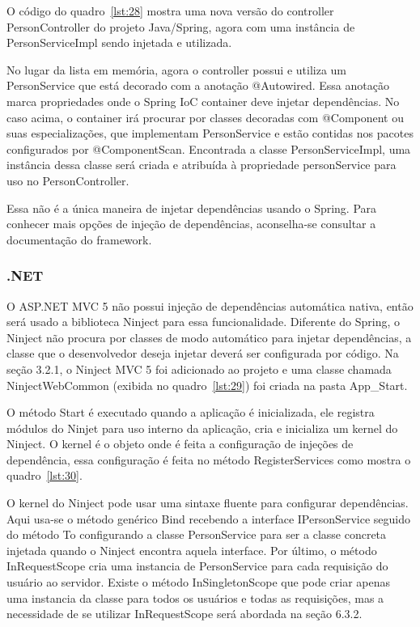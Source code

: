 \documentclass[a4paper,12pt]{article}
\newcommand{\javacode}[3] {
	
}
\newcommand{\sharpcode}[3] {
	
}
\begin{document}
O código do quadro~\ref{lst:28} mostra uma nova versão do controller PersonController do projeto Java/Spring, agora com uma instância de PersonServiceImpl sendo injetada e utilizada.

\javacode{code/28.txt}{PersonController utilizando PersonService no projeto Java/Spring}{lst:28}

No lugar da lista em memória, agora o controller possui e utiliza um PersonService que  está decorado com a anotação @Autowired. Essa anotação marca propriedades onde o Spring IoC container deve injetar dependências. No caso acima, o container irá procurar por classes decoradas com @Component ou suas especializações, que implementam PersonService e estão contidas nos pacotes configurados por @ComponentScan. Encontrada a classe PersonServiceImpl, uma instância dessa classe será criada e atribuída à propriedade personService para uso no PersonController.

Essa não é a única maneira de injetar dependências usando o Spring. Para conhecer mais opções de injeção de dependências, aconselha-se consultar a documentação do framework.

\subsubsection{.NET}

O ASP.NET MVC 5 não possui injeção de dependências automática nativa, então será usado a biblioteca Ninject para essa funcionalidade. Diferente do Spring, o Ninject não procura por classes de modo automático para injetar dependências, a classe que o desenvolvedor deseja injetar deverá ser configurada por código. Na seção 3.2.1, o Ninject MVC 5 foi adicionado ao projeto e uma classe chamada NinjectWebCommon (exibida no quadro~\ref{lst:29}) foi criada na pasta App\_Start. 

\sharpcode{code/29.txt}{Classe NinjectWebCommon}{lst:29}

O método Start é executado quando a aplicação é inicializada, ele registra módulos do Ninjet para uso interno da aplicação, cria e inicializa um kernel do Ninject. O kernel é o objeto onde é feita a configuração de injeções de dependência, essa configuração é feita no método RegisterServices como mostra o quadro~\ref{lst:30}.

\sharpcode{code/30.txt}{Registro de dependências no Ninject}{lst:30}

O kernel do Ninject pode usar uma sintaxe fluente para configurar dependências. Aqui usa-se o método genérico Bind recebendo a interface IPersonService seguido do método To configurando a classe PersonService para ser a classe concreta injetada quando o Ninject encontra aquela interface. Por último, o método InRequestScope cria uma instancia de PersonService para cada requisição do usuário ao servidor. Existe o método InSingletonScope que pode criar apenas uma instancia da classe para todos os usuários e todas as requisições, mas a necessidade de se utilizar InRequestScope será abordada na seção 6.3.2.
\end{document}
